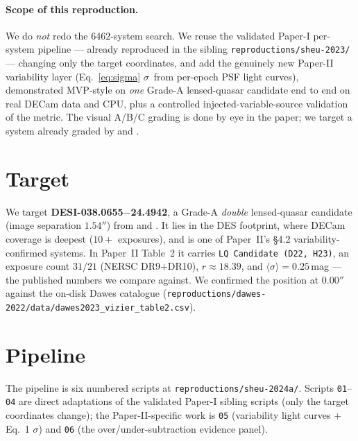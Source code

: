 \documentclass[11pt,letterpaper]{article}
\newcommand{\sig}{\ensuremath{\sigma}}
\newcommand{\meansig}{\ensuremath{\langle\sigma\rangle}}
\newcommand{\target}{DESI-038.0655$-$24.4942}
\begin{document}
\paragraph{Scope of this reproduction.} We do \emph{not} redo the
$6462$-system search. We reuse the validated Paper-I per-system pipeline ---
already reproduced in the sibling \texttt{reproductions/sheu-2023/} ---
changing only the target coordinates, and add the genuinely new Paper-II
variability layer (Eq.~\ref{eq:sigma} \sig\ from per-epoch PSF light curves),
demonstrated MVP-style on \emph{one} Grade-A lensed-quasar candidate end to end
on real DECam data and CPU, plus a controlled injected-variable-source
validation of the metric. The visual A/B/C grading is done by eye in the paper;
we target a system already graded by \citet{dawes2023qso} and
\citet{he2023qso}.

\section{Target}

We target \textbf{\target}, a Grade-A \emph{double} lensed-quasar candidate
(image separation $1.54''$) from \citet{dawes2023qso} and \citet{he2023qso}.
It lies in the DES footprint, where DECam coverage is deepest ($10+$
exposures), and is one of Paper~II's \S4.2 variability-confirmed systems. In
Paper~II Table~2 it carries \texttt{LQ Candidate (D22, H23)}, an exposure
count $31/21$ (NERSC DR9$+$DR10), $r \approx 18.39$, and
$\meansig = \mathbf{0.25}$\,mag --- the published numbers we compare against.
We confirmed the position at $0.00''$ against the on-disk Dawes catalogue
(\texttt{reproductions/dawes-2022/data/dawes2023\_vizier\_table2.csv}).

\section{Pipeline}

The pipeline is six numbered scripts at \texttt{reproductions/sheu-2024a/}.
Scripts \texttt{01}--\texttt{04} are direct adaptations of the validated
Paper-I sibling scripts (only the target coordinates change); the
Paper-II-specific work is \texttt{05} (variability light curves + Eq.~1 \sig)
and \texttt{06} (the over/under-subtraction evidence panel).
\end{document}

